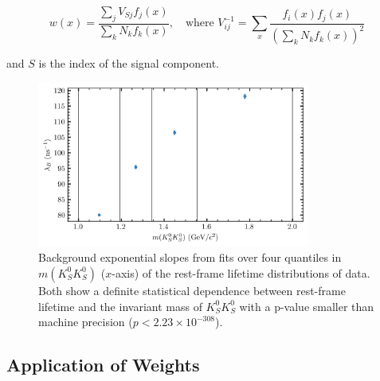 \begin{equation}
  w(x) = \frac{\sum_{j} V_{Sj}f_j(x)}{\sum_{k}N_kf_k(x)},\quad \text{where } V_{ij}^{-1} = \sum_{x} \frac{f_i(x)f_j(x)}{\left(\sum_{k} N_kf_k(x)\right)^2}
  \label{eq:splot-weights-factorizing}
\end{equation}

and $S$ is the index of the signal component.


\begin{figure}
  \begin{center}
    \includegraphics[width=0.8\textwidth]{figures/factorization_plot_data_chisqdof_3.4_4_quantiles.png}
  \end{center}
  \caption{Background exponential slopes from fits over four quantiles in $m(K_S^0K_S^0)$ ($x$-axis) of the rest-frame lifetime distributions of data. Both show a definite statistical dependence between rest-frame lifetime and the invariant mass of $K_S^0K_S^0$ with a p-value smaller than machine precision ($p < 2.23 \times 10^{-308}$).}\label{fig:factorization}
\end{figure}

\subsection{Application of Weights}\label{sec:application-of-weights}

